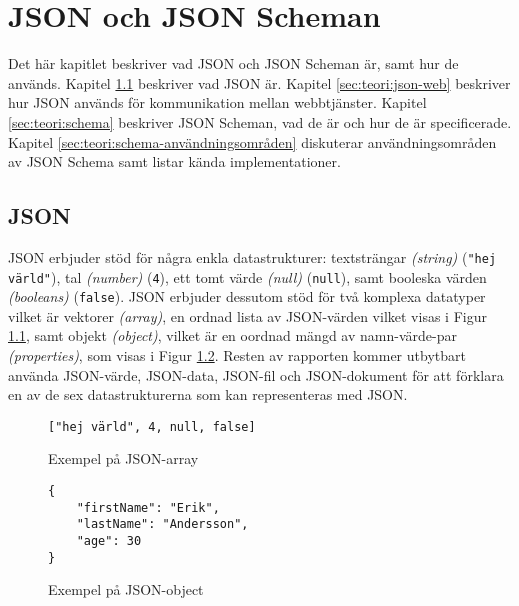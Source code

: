 \chapter{JSON och JSON Scheman}
\label{sec:teori}
Det här kapitlet beskriver vad JSON och JSON Scheman är, samt hur de används. Kapitel \ref{sec:teori:json} beskriver vad JSON är. Kapitel \ref{sec:teori:json-web} beskriver hur JSON används för kommunikation mellan webbtjänster. Kapitel \ref{sec:teori:schema} beskriver JSON Scheman, vad de är och hur de är specificerade. Kapitel \ref{sec:teori:schema-användningsområden} diskuterar användningsområden av JSON Schema samt listar kända implementationer.

\section{JSON}
\label{sec:teori:json}
JSON erbjuder stöd för några enkla datastrukturer: textsträngar \textit{(string)} (\texttt{"hej värld"}), tal \textit{(number)} (\texttt{4}), ett tomt värde \textit{(null)} (\texttt{null}), samt booleska värden \textit{(booleans)} (\texttt{false}). JSON erbjuder dessutom stöd för två komplexa datatyper vilket är vektorer \textit{(array)}, en ordnad lista av JSON-värden vilket visas i Figur \ref{fig:json-array-example}, samt objekt \textit{(object)}, vilket är en oordnad mängd av namn-värde-par \textit{(properties)}, som visas i Figur \ref{fig:json-object-example}. Resten av rapporten kommer utbytbart använda JSON-värde, JSON-data, JSON-fil och JSON-dokument för att förklara en av de sex datastrukturerna som kan representeras med JSON.

\begin{figure}
	\begin{verbatim}
["hej värld", 4, null, false]
	\end{verbatim}
	\vspace{-1.7em}
	\caption{Exempel på JSON-array}
	\label{fig:json-array-example}
\end{figure}

\begin{figure}
	\begin{verbatim}
{
	"firstName": "Erik",
	"lastName": "Andersson",
	"age": 30
}
	\end{verbatim}
	\vspace{-1.7em}
	\caption{Exempel på JSON-object}
	\label{fig:json-object-example}
\end{figure}

